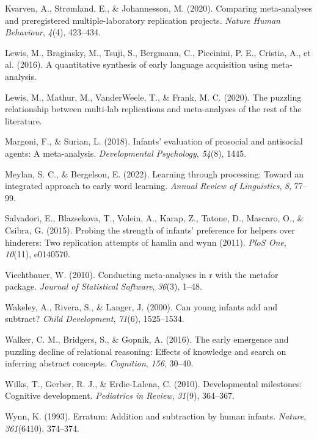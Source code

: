 \documentclass[10pt, letterpaper]{article}
\newenvironment{CSLReferences}%
  {}%
  {\par}
\begin{document}
\begin{CSLReferences}{1}{0}
\leavevmode{}%
Kvarven, A., Strømland, E., \& Johannesson, M. (2020). Comparing
meta-analyses and preregistered multiple-laboratory replication
projects. \emph{Nature Human Behaviour}, \emph{4}(4), 423--434.

\leavevmode{}%
Lewis, M., Braginsky, M., Tsuji, S., Bergmann, C., Piccinini, P. E.,
Cristia, A., et al. (2016). A quantitative synthesis of early language
acquisition using meta-analysis.

\leavevmode{}%
Lewis, M., Mathur, M., VanderWeele, T., \& Frank, M. C. (2020). The
puzzling relationship between multi-lab replications and meta-analyses
of the rest of the literature.

\leavevmode{}%
Margoni, F., \& Surian, L. (2018). Infants' evaluation of prosocial and
antisocial agents: A meta-analysis. \emph{Developmental Psychology},
\emph{54}(8), 1445.

\leavevmode{}%
Meylan, S. C., \& Bergelson, E. (2022). Learning through processing:
Toward an integrated approach to early word learning. \emph{Annual
Review of Linguistics}, \emph{8}, 77--99.

\leavevmode{}%
Salvadori, E., Blazsekova, T., Volein, A., Karap, Z., Tatone, D.,
Mascaro, O., \& Csibra, G. (2015). Probing the strength of infants'
preference for helpers over hinderers: Two replication attempts of
hamlin and wynn (2011). \emph{PloS One}, \emph{10}(11), e0140570.

\leavevmode{}%
Viechtbauer, W. (2010). Conducting meta-analyses in r with the metafor
package. \emph{Journal of Statistical Software}, \emph{36}(3), 1--48.

\leavevmode{}%
Wakeley, A., Rivera, S., \& Langer, J. (2000). Can young infants add and
subtract? \emph{Child Development}, \emph{71}(6), 1525--1534.

\leavevmode{}%
Walker, C. M., Bridgers, S., \& Gopnik, A. (2016). The early emergence
and puzzling decline of relational reasoning: Effects of knowledge and
search on inferring abstract concepts. \emph{Cognition}, \emph{156},
30--40.

\leavevmode{}%
Wilks, T., Gerber, R. J., \& Erdie-Lalena, C. (2010). Developmental
milestones: Cognitive development. \emph{Pediatrics in Review},
\emph{31}(9), 364--367.

\leavevmode{}%
Wynn, K. (1993). Erratum: Addition and subtraction by human infants.
\emph{Nature}, \emph{361}(6410), 374--374.

\end{CSLReferences}


\end{document}
